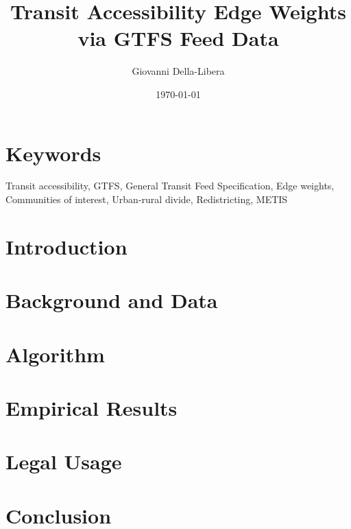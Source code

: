 \documentclass[12pt]{article}
\title{\textbf{Transit Accessibility Edge Weights\\
via GTFS Feed Data}}
\author{Giovanni Della-Libera}
\date{\today}
\begin{document}
\maketitle

\begin{abstract}

\end{abstract}

\section*{Keywords}
Transit accessibility, GTFS, General Transit Feed Specification, Edge weights,
Communities of interest, Urban-rural divide, Redistricting, METIS

\section{Introduction}


\section{Background and Data}


\section{Algorithm}


\section{Empirical Results}


\section{Legal Usage}


\section{Conclusion}




\end{document}

